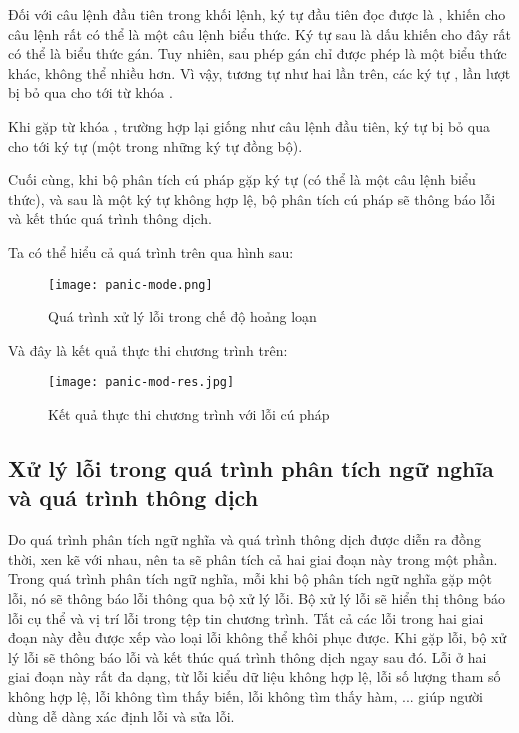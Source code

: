     Đối với câu lệnh đầu tiên trong khối lệnh, ký tự đầu tiên đọc được là , khiến cho câu lệnh rất có thể là một câu lệnh biểu thức. Ký tự sau  là dấu \kw{=} khiến cho đây rất có thể là biểu thức gán. Tuy nhiên, sau phép gán chỉ được phép là một biểu thức khác, không thể nhiều hơn. Vì vậy, tương tự như hai lần trên, các ký tự ,  lần lượt bị bỏ qua cho tới từ khóa . 

Khi gặp từ khóa , trường hợp lại giống như câu lệnh đầu tiên, ký tự  bị bỏ qua cho tới ký tự \kw{\}} (một trong những ký tự đồng bộ).

    Cuối cùng, khi bộ phân tích cú pháp gặp ký tự  (có thể là một câu lệnh biểu thức), và sau  là một ký tự không hợp lệ, bộ phân tích cú pháp sẽ thông báo lỗi và kết thúc quá trình thông dịch.

Ta có thể hiểu cả quá trình trên qua hình sau:  

\begin{figure}[H]
    \centering
    \texttt{[image: panic-mode.png]}
    \caption{Quá trình xử lý lỗi trong chế độ hoảng loạn}
\end{figure}

Và đây là kết quả thực thi chương trình trên:

\begin{figure}[H]
    \centering
    \texttt{[image: panic-mod-res.jpg]}
    \caption{Kết quả thực thi chương trình với lỗi cú pháp}
\end{figure}

\subsection{Xử lý lỗi trong quá trình phân tích ngữ nghĩa và quá trình thông dịch}

    Do quá trình phân tích ngữ nghĩa và quá trình thông dịch được diễn ra đồng thời, xen kẽ với nhau, nên ta sẽ phân tích cả hai giai đoạn này trong một phần. Trong quá trình phân tích ngữ nghĩa, mỗi khi bộ phân tích ngữ nghĩa gặp một lỗi, nó sẽ thông báo lỗi thông qua bộ xử lý lỗi. Bộ xử lý lỗi sẽ hiển thị thông báo lỗi cụ thể và vị trí lỗi trong tệp tin chương trình. Tất cả các lỗi trong hai giai đoạn này đều được xếp vào loại lỗi không thể khôi phục được. Khi gặp lỗi, bộ xử lý lỗi sẽ thông báo lỗi và kết thúc quá trình thông dịch ngay sau đó. Lỗi ở hai giai đoạn này rất đa dạng, từ lỗi kiểu dữ liệu không hợp lệ, lỗi số lượng tham số không hợp lệ, lỗi không tìm thấy biến, lỗi không tìm thấy hàm, ... giúp người dùng dễ dàng xác định lỗi và sửa lỗi.
